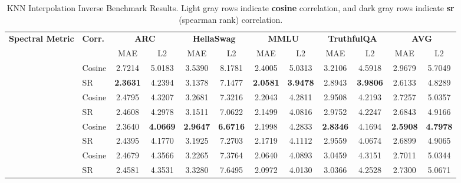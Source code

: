 \begin{table}[t!]
\centering
\small
\setlength{\tabcolsep}{3pt} 
\caption{KNN Interpolation Inverse Benchmark Results. Light gray rows indicate \textbf{cosine} correlation, and dark gray rows indicate \textbf{sr} (spearman rank) correlation.}
\label{tab:knn_benchmark}
\begin{tabular}{llcccccccccc}
\toprule
\multirow{2}{*}{\textbf{Spectral Metric}} & \multirow{2}{*}{\textbf{Corr.}} & \multicolumn{2}{c}{\textbf{ARC}} & \multicolumn{2}{c}{\textbf{HellaSwag}} & \multicolumn{2}{c}{\textbf{MMLU}} & \multicolumn{2}{c}{\textbf{TruthfulQA}} & \multicolumn{2}{c}{\textbf{AVG}} \\
\cmidrule(lr){3-4} \cmidrule(lr){5-6} \cmidrule(lr){7-8} \cmidrule(lr){9-10} \cmidrule(lr){11-12}
& & MAE & L2 & MAE & L2 & MAE & L2 & MAE & L2 & MAE & L2 \\
\midrule

\rowcolor{lightgray}
\cellcolor{white} & Cosine & 2.7214 & 5.0183 & 3.5390 & 8.1781 & 2.4005 & 5.0313 & 3.2106 & 4.5918 & 2.9679 & 5.7049 \\
\rowcolor{gray!40}\cellcolor{white}
\multirow{-2}{*}{\textbf{\LOGALPHANORM}} & SR & \textbf{2.3631} & 4.2394 & 3.1378 & 7.1477 & \textbf{2.0581} & \textbf{3.9478} & 2.8943 & \textbf{3.9806} & 2.6133 & 4.8289 \\

\midrule

\rowcolor{lightgray}
\cellcolor{white} & Cosine & 2.4795 & 4.3207 & 3.2681 & 7.3216 & 2.2043 & 4.2811 & 2.9508 & 4.2193 & 2.7257 & 5.0357 \\
\rowcolor{gray!40}\cellcolor{white}
\multirow{-2}{*}{\textbf{\SPECTRALNORM}} & SR & 2.4608 & 4.2978 & 3.1511 & 7.0622 & 2.1499 & 4.0816 & 2.9752 & 4.2247 & 2.6843 & 4.9166 \\

\midrule

\rowcolor{lightgray}
\cellcolor{white} & Cosine & 2.3640 & \textbf{4.0669} & \textbf{2.9647} & \textbf{6.6716} & 2.1998 & 4.2833 & \textbf{2.8346} & 4.1694 & \textbf{2.5908} & \textbf{4.7978} \\
\rowcolor{gray!40}\cellcolor{white}
\multirow{-2}{*}{\textbf{\STABLERANK}} & SR & 2.4395 & 4.1770 & 3.1925 & 7.2703 & 2.1719 & 4.1112 & 2.9559 & 4.0674 & 2.6899 & 4.9065 \\

\midrule

\rowcolor{lightgray}
\cellcolor{white} & Cosine & 2.4679 & 4.3566 & 3.2265 & 7.3764 & 2.0640 & 4.0893 & 3.0459 & 4.3151 & 2.7011 & 5.0344 \\
\rowcolor{gray!40}\cellcolor{white}
\multirow{-2}{*}{\textbf{\ALPHAHILL}} & SR & 2.4581 & 4.3531 & 3.3280 & 7.6495 & 2.0972 & 4.0130 & 3.0366 & 4.2528 & 2.7300 & 5.0671 \\

\bottomrule
\end{tabular}
\end{table}



